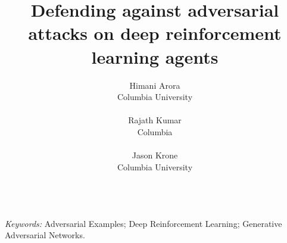 \documentclass[12pt]{article}
\title{%
\textbf{Defending against adversarial attacks on deep reinforcement learning agents}
}
\author{
Himani Arora \\
Columbia University \\
\\
Rajath Kumar\\
Columbia\\
\\
Jason Krone\\
Columbia University \\
\\
}
\begin{document}
\maketitle
\bigskip



\emph{Keywords:}
Adversarial Examples;
Deep Reinforcement Learning;
Generative Adversarial Networks.

\clearpage
\glsresetall{}

%

\clearpage












\clearpage

%




\clearpage
\appendix

%
\end{document}
